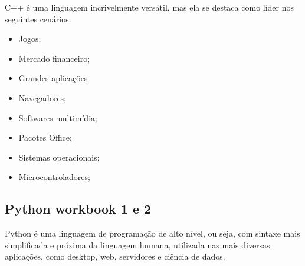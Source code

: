 C++ é uma linguagem incrivelmente versátil, mas ela se destaca como líder nos seguintes cenários:\cite{C++}
\begin{itemize}
\item Jogos;
\item Mercado financeiro;
\item Grandes aplicações
\item Navegadores;
\item Softwares multimídia;
\item Pacotes Office;
\item Sistemas operacionais;
\item Microcontroladores; 
\end{itemize} 

\subsection{Python workbook 1 e 2}
Python é uma linguagem de programação de alto nível, ou seja, com sintaxe mais simplificada e próxima da 
linguagem humana, utilizada nas mais diversas aplicações, como desktop, web, servidores e ciência de dados.

